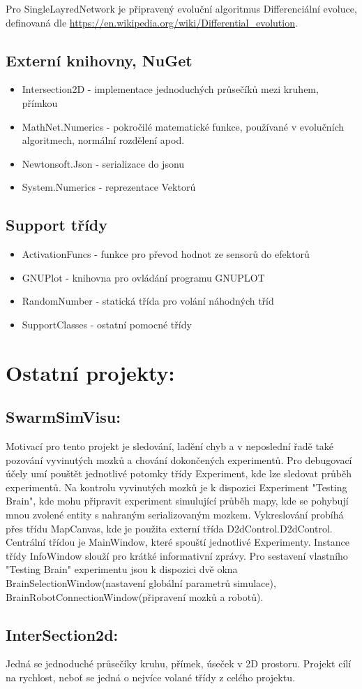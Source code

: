 \documentclass[12pt, oneside]{article}
\begin{document}
Pro SingleLayredNetwork je připravený evoluční algoritmus Differenciální evoluce, definovaná dle  \url{https://en.wikipedia.org/wiki/Differential_evolution}.

\subsection{Externí knihovny, NuGet}
\begin{itemize}
	\item Intersection2D - implementace jednoduchých průsečíků mezi kruhem, přímkou 
	\item MathNet.Numerics - pokročilé matematické funkce, používané v evolučních  algoritmech, normální rozdělení apod.
	\item Newtonsoft.Json - serializace do jsonu
	\item System.Numerics - reprezentace Vektorú
	
\end{itemize} 
\subsection{Support třídy} 
\begin{itemize}
	\item ActivationFuncs - funkce pro převod hodnot ze sensorů do efektorů
	\item GNUPlot - knihovna pro ovládání programu GNUPLOT 
	\item RandomNumber  - statická třída pro volání náhodných tříd
	\item SupportClasses - ostatní pomocné třídy
	
\end{itemize}

\newpage
\section{Ostatní projekty:}
\subsection{SwarmSimVisu:}
Motivací pro tento projekt je sledování, ladění chyb a v neposlední řadě také pozování vyvinutých mozků a chování dokončených experimentů. Pro debugovací účely umí pouštět jednotlivé potomky třídy Experiment, kde lze sledovat průběh experimentů. Na kontrolu vyvinutých mozků je k dispozici Experiment "Testing Brain", kde mohu připravit experiment simulující průběh mapy, kde se pohybují mnou zvolené entity s nahraným serializovaným mozkem. Vykreslování probíhá přes třídu MapCanvas, kde je použita externí třída D2dControl.D2dControl. Centrální třídou je MainWindow, které spouští jednotlivé Experimenty. Instance třídy InfoWindow slouží pro krátké informativní zprávy. Pro sestavení vlastního "Testing Brain" experimentu jsou k dispozici dvě okna BrainSelectionWindow(nastavení globální parametrů simulace), BrainRobotConnectionWindow(připravení mozků a robotů). 
\subsection{InterSection2d:}
Jedná se  jednoduché průsečíky kruhu, přímek, úseček v 2D prostoru. Projekt cílí na rychlost, neboť se jedná o nejvíce volané třídy z celého projektu.
\par
\end{document}
